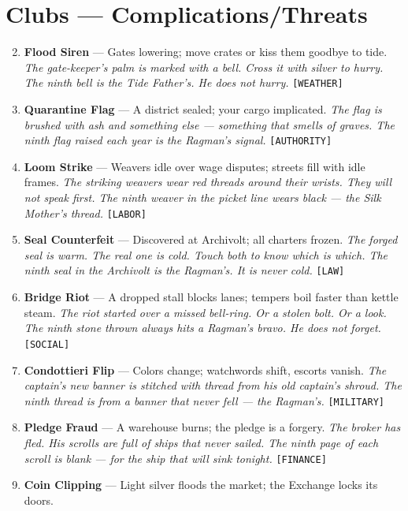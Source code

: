 \section*{Clubs --- Complications/Threats}
\label{sec:silkstrand-complications}
\begin{enumerate}
\setcounter{enumi}{1}
\item \textbf{Flood Siren} --- Gates lowering; move crates or kiss them goodbye to tide.
  \hfill \textit{The gate-keeper's palm is marked with a bell. Cross it with silver to hurry. The ninth bell is the Tide Father's. He does not hurry.} \texttt{[WEATHER]}
\item \textbf{Quarantine Flag} --- A district sealed; your cargo implicated.
  \hfill \textit{The flag is brushed with ash and something else --- something that smells of graves. The ninth flag raised each year is the Ragman's signal.} \texttt{[AUTHORITY]}
\item \textbf{Loom Strike} --- Weavers idle over wage disputes; streets fill with idle frames.
  \hfill \textit{The striking weavers wear red threads around their wrists. They will not speak first. The ninth weaver in the picket line wears black --- the Silk Mother's thread.} \texttt{[LABOR]}
\item \textbf{Seal Counterfeit} --- Discovered at Archivolt; all charters frozen.
  \hfill \textit{The forged seal is warm. The real one is cold. Touch both to know which is which. The ninth seal in the Archivolt is the Ragman's. It is never cold.} \texttt{[LAW]}
\item \textbf{Bridge Riot} --- A dropped stall blocks lanes; tempers boil faster than kettle steam.
  \hfill \textit{The riot started over a missed bell-ring. Or a stolen bolt. Or a look. The ninth stone thrown always hits a Ragman's bravo. He does not forget.} \texttt{[SOCIAL]}
\item \textbf{Condottieri Flip} --- Colors change; watchwords shift, escorts vanish.
  \hfill \textit{The captain's new banner is stitched with thread from his old captain's shroud. The ninth thread is from a banner that never fell --- the Ragman's.} \texttt{[MILITARY]}
\item \textbf{Pledge Fraud} --- A warehouse burns; the pledge is a forgery.
  \hfill \textit{The broker has fled. His scrolls are full of ships that never sailed. The ninth page of each scroll is blank --- for the ship that will sink tonight.} \texttt{[FINANCE]}
\item \textbf{Coin Clipping} --- Light silver floods the market; the Exchange locks its doors.

\end{enumerate}
